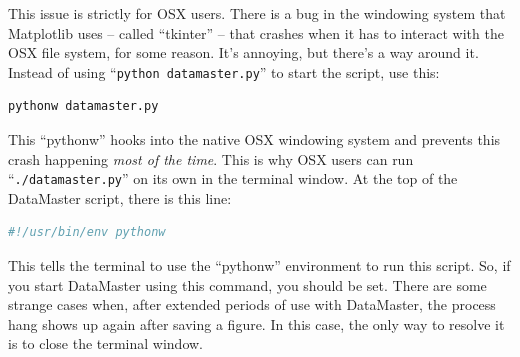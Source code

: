 \documentclass[12pt]{article}
\begin{document}
{This issue is strictly for OSX users. There is a bug in the windowing system that Matplotlib uses -- called ``tkinter'' -- that crashes when it has to interact with the OSX file system, for some reason. It's annoying, but there's a way around it. Instead of using ``\texttt{python datamaster.py}'' to start the script, use this:
\begin{framed}
  \begin{lstlisting}[language=sh]
    pythonw datamaster.py
  \end{lstlisting}
\end{framed}
This ``pythonw'' hooks into the native OSX windowing system and prevents this crash happening \textit{most of the time}. This is why OSX users can run ``\texttt{./datamaster.py}'' on its own in the terminal window. At the top of the DataMaster script, there is this line:
\begin{framed}
  \begin{lstlisting}[language=sh]
    #!/usr/bin/env pythonw
  \end{lstlisting}
\end{framed}
This tells the terminal to use the ``pythonw'' environment to run this script. So, if you start DataMaster using this command, you should be set. There are some strange cases when, after extended periods of use with DataMaster, the process hang shows up again after saving a figure. In this case, the only way to resolve it is to close the terminal window.

\printbibliography[title={References}]

}
\end{document}
